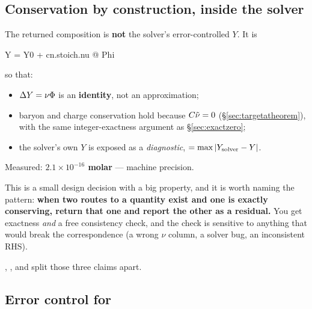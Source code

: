 \subsection{Conservation by construction, inside the solver}
\label{sec:solverconservation}

The returned composition is \textbf{not} the solver's error-controlled $Y$. It
is

\begin{srclisting}
Y = Y0 + cn.stoich.nu @ Phi
\end{srclisting}

so that:

\begin{itemize}
\item $\Delta Y = \nu\Phi$ is an \textbf{identity}, not an approximation;
\item baryon and charge conservation hold because $C\tilde\nu = 0$
  (\S\ref{sec:targetatheorem}), with the same integer-exactness argument as
  \S\ref{sec:exactzero};
\item the solver's own $Y$ is exposed as a \emph{diagnostic},
   $= \max|Y_{\rm solver} - Y|$.
\end{itemize}

Measured: \textbf{$2.1\times10^{-16}$ molar} --- machine precision.

\begin{invariant}
This is a small design decision with a big property, and it is worth naming the
pattern: \textbf{when two routes to a quantity exist and one is exactly
conserving, return that one and report the other as a residual.} You get
exactness \emph{and} a free consistency check, and the check is sensitive to
anything that would break the correspondence (a wrong $\nu$ column, a solver
bug, an inconsistent RHS).
\end{invariant}

,
, and
 split those three claims apart.

\subsection{Error control for \texorpdfstring{\Phifl}{Phi}}
\label{sec:errorcontrol}

